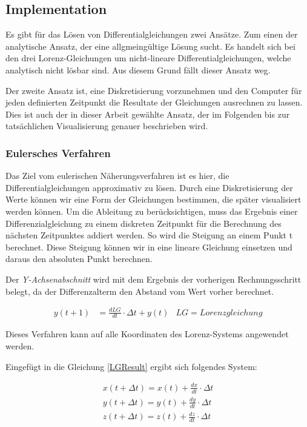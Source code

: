 \subsection{Implementation}
Es gibt für das Lösen von Differentialgleichungen zwei Ansätze. Zum einen der analytische Ansatz, der eine allgmeingültige Lösung sucht. Es handelt sich bei den drei Lorenz-Gleichungen um nicht-lineare Differentialgleichungen, welche analytisch nicht lösbar sind. Aus diesem Grund fällt dieser Ansatz weg. 

Der zweite Ansatz ist, eine Diskretisierung vorzunehmen und den Computer für jeden definierten Zeitpunkt die Resultate der Gleichungen ausrechnen zu lassen. Dies ist auch der in dieser Arbeit gewählte Ansatz, der im Folgenden bis zur tatsächlichen Visualisierung genauer beschrieben wird. 

\subsubsection{Eulersches Verfahren}

Das Ziel vom eulerischen Näherungsverfahren ist es hier, die Differentialgleichungen approximativ zu lösen. Durch eine Diskretisierung der Werte können wir eine Form der Gleichungen bestimmen, die später visualisiert werden können. Um die Ableitung zu berücksichtigen, muss das Ergebnis einer Differenzialgleichung zu einem diskreten Zeitpunkt für die Berechnung des nächsten Zeitpunktes addiert werden. So wird die Steigung an einem Punkt t berechnet. Diese Steigung können wir in eine lineare Gleichung einsetzen und daraus den absoluten Punkt berechnen.

Der \textit{Y-Achsenabschnitt} wird mit dem Ergebnis der vorherigen Rechnungsschritt belegt, da der Differenzalterm den Abstand vom Wert vorher berechnet.  

\begin{align}
\label{LGResult}
y(t + 1) &= \frac{d LG}{d t} \cdot  \Delta t + y(t) & LG = Lorenzgleichung
\end{align}

Dieses Verfahren kann auf alle Koordinaten des Lorenz-Systems angewendet werden.

Eingefügt in die Gleichung \eqref{LGResult} ergibt sich folgendes System:

\begin{align}
x(t+\Delta t) = x(t) + \frac{dx}{dt} \cdot \Delta t\\
y(t + \Delta t) = y(t) + \frac{dy}{dt} \cdot \Delta t\\
z(t + \Delta t) = z(t) + \frac{dz}{dt} \cdot \Delta t
\end{align}

